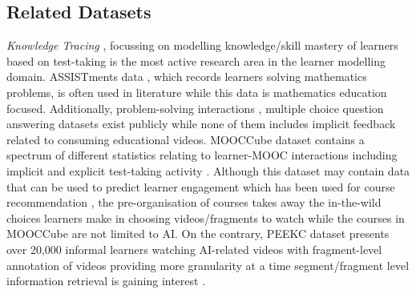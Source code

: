 \documentclass[letterpaper]{article} %
\begin{document}
\subsection{Related Datasets}

\emph{Knowledge Tracing} \cite{corbett1994knowledge,deep_kt}, focussing on modelling knowledge/skill mastery of learners based on test-taking is the most active research area in the learner modelling domain. ASSISTments data \cite{assistments_data}, which records learners solving mathematics problems, is often used in literature while this data is mathematics education focused. 
Additionally, 
problem-solving interactions \cite{choi2020ednet}, multiple choice question answering \cite{wang2020diagnostic,wang2021educational} datasets exist publicly while none of them includes implicit feedback related to consuming educational videos. 
MOOCCube dataset contains a spectrum of different statistics relating to learner-MOOC interactions including implicit and explicit test-taking activity \cite{yu2020mooccube}. Although this dataset may contain data that can be used to predict learner engagement which has been used for course recommendation \cite{deng2023knowledge}, the pre-organisation of courses takes away the in-the-wild choices learners make in choosing videos/fragments to watch while the courses in MOOCCube are not limited to AI. On the contrary, PEEKC dataset presents over 20,000 informal learners watching AI-related videos with fragment-level annotation of videos providing more granularity at a time segment/fragment level information retrieval is gaining interest \cite{yu2020spotify}. 
\end{document}
